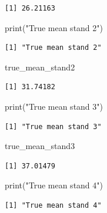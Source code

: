 \documentclass[
  letterpaper,
  DIV=11,
  numbers=noendperiod]{scrartcl}
\newenvironment{Shaded}{\begin{snugshade}}{\end{snugshade}}
\newcommand{\FunctionTok}[1]{\textcolor[rgb]{0.28,0.35,0.67}{#1}}
\newcommand{\NormalTok}[1]{\textcolor[rgb]{0.00,0.23,0.31}{#1}}
\newcommand{\StringTok}[1]{\textcolor[rgb]{0.13,0.47,0.30}{#1}}
\begin{document}
\begin{verbatim}
[1] 26.21163
\end{verbatim}

\begin{Shaded}
\begin{Highlighting}[]
\FunctionTok{print}\NormalTok{(}\StringTok{"True mean stand 2"}\NormalTok{)}
\end{Highlighting}
\end{Shaded}

\begin{verbatim}
[1] "True mean stand 2"
\end{verbatim}

\begin{Shaded}
\begin{Highlighting}[]
\NormalTok{true\_mean\_stand2}
\end{Highlighting}
\end{Shaded}

\begin{verbatim}
[1] 31.74182
\end{verbatim}

\begin{Shaded}
\begin{Highlighting}[]
\FunctionTok{print}\NormalTok{(}\StringTok{"True mean stand 3"}\NormalTok{)}
\end{Highlighting}
\end{Shaded}

\begin{verbatim}
[1] "True mean stand 3"
\end{verbatim}

\begin{Shaded}
\begin{Highlighting}[]
\NormalTok{true\_mean\_stand3}
\end{Highlighting}
\end{Shaded}

\begin{verbatim}
[1] 37.01479
\end{verbatim}

\begin{Shaded}
\begin{Highlighting}[]
\FunctionTok{print}\NormalTok{(}\StringTok{"True mean stand 4"}\NormalTok{)}
\end{Highlighting}
\end{Shaded}

\begin{verbatim}
[1] "True mean stand 4"
\end{verbatim}
\end{document}
